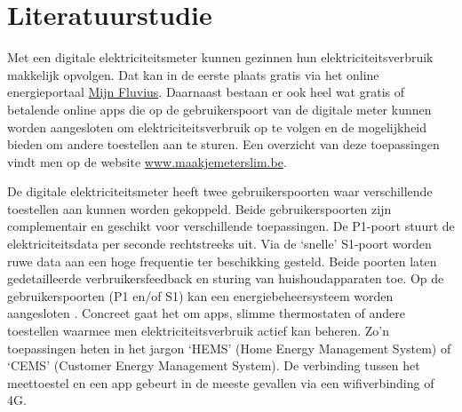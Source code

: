 \documentclass{hogent-article}
\begin{document}
\section{Literatuurstudie}%
\label{sec:literatuurstudie}

Met een digitale elektriciteitsmeter kunnen gezinnen hun elektriciteitsverbruik makkelijk opvolgen. Dat kan in de eerste plaats gratis via het online energieportaal \href{https://login.fluvius.be/klanten.onmicrosoft.com/b2c_1a_customer_signup_signin/oauth2/v2.0/authorize?client_id=91bb9a0a-f45d-491a-ae0b-43324fbc343a&scope=openid%20profile%20offline_access&redirect_uri=https%3A%2F%2Fmijn.fluvius.be%2Fredirect&client-request-id=90c12c72-7d7b-428b-98fc-5d7956e53a60&response_mode=fragment&response_type=code&x-client-SKU=msal.js.browser&x-client-VER=2.23.0&client_info=1&code_challenge=jz-1E8AwB15UEa352eC_5x6zDtAtwp3Je6jrFVdGKjk&code_challenge_method=S256&nonce=cee3d720-d931-4b13-b0b5-c473169ca6fd&state=eyJpZCI6IjRhM2I3M2NkLTgyZjgtNDFjOC05NzAyLTEwMTNjNjNkNjNhMyIsIm1ldGEiOnsiaW50ZXJhY3Rpb25UeXBlIjoicmVkaXJlY3QifX0%3D}{Mijn Fluvius}. Daarnaast bestaan er ook heel wat gratis of betalende online apps die op de gebruikerspoort van de digitale meter kunnen worden aangesloten om elektriciteitsverbruik op te volgen en de mogelijkheid bieden om andere toestellen aan te sturen. Een overzicht van deze toepassingen vindt men op de website \href{https://maakjemeterslim.be/}{www.maakjemeterslim.be}.

De digitale elektriciteitsmeter heeft twee gebruikerspoorten waar verschillende toestellen aan kunnen worden gekoppeld. Beide gebruikerspoorten zijn complementair en geschikt voor verschillende toepassingen. De P1-poort stuurt de elektriciteitsdata per seconde rechtstreeks uit. Via de ‘snelle’ S1-poort worden ruwe data aan een hoge frequentie ter beschikking gesteld. Beide poorten laten gedetailleerde verbruikersfeedback en sturing van huishoudapparaten toe. Op de gebruikerspoorten (P1 en/of S1) kan een energiebeheersysteem worden aangesloten \autocite{Depuydt2021}. Concreet gaat het om apps, slimme thermostaten of andere toestellen waarmee men elektriciteitsverbruik actief kan beheren. Zo’n toepassingen heten in het jargon ‘HEMS’ (Home Energy Management System) of ‘CEMS’ (Customer Energy Management System). De verbinding tussen het meettoestel en een app gebeurt in de meeste gevallen via een wifiverbinding of 4G.
\end{document}

